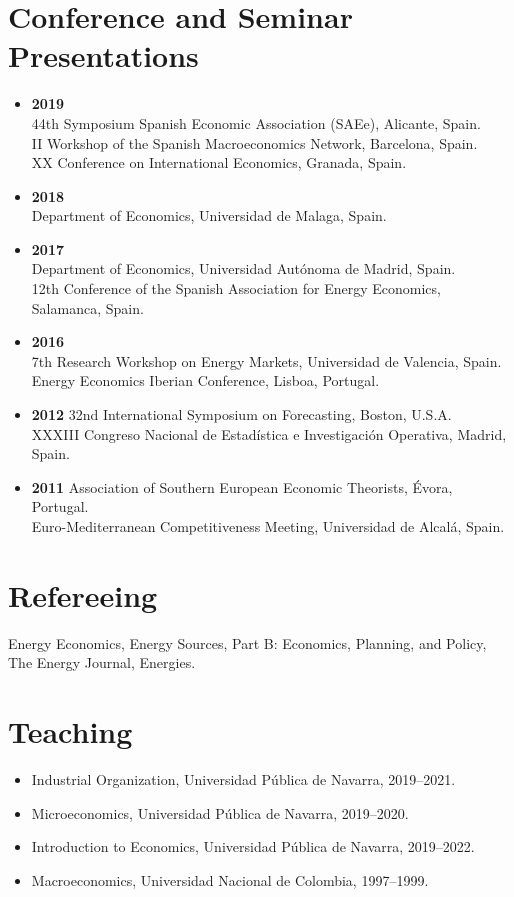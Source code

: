 \documentclass[11pt]{article}\usepackage[]{graphicx}\usepackage[usenames,dvipsnames]{xcolor}
\begin{document}
\section{Conference and Seminar Presentations} 
\begin{itemize}
  \item \textbf{2019}\\
  44th Symposium Spanish Economic Association (SAEe), Alicante, Spain.\\
  II Workshop of the Spanish Macroeconomics Network, Barcelona, Spain.\\
  XX Conference on International Economics, Granada, Spain.
  \item \textbf{2018}\\
  Department of Economics, Universidad de Malaga, Spain.
  \item \textbf{2017}\\
  Department of Economics, Universidad Autónoma de Madrid, Spain.\\
  12th Conference of the Spanish Association for Energy Economics, Salamanca, Spain.
  \item \textbf{2016}\\
  7th Research Workshop on Energy Markets, Universidad de Valencia, Spain.\\
  Energy Economics Iberian Conference, Lisboa, Portugal.
  \item \textbf{2012} 32nd International Symposium on Forecasting, Boston, U.S.A.\\
  XXXIII Congreso Nacional de Estadística e Investigación Operativa, Madrid, Spain.
  \item \textbf{2011} Association of Southern European Economic Theorists, Évora, Portugal.\\
  Euro-Mediterranean Competitiveness Meeting, Universidad de Alcalá, Spain.
\end{itemize}

\section{Refereeing}
\raggedright
Energy Economics, Energy Sources, Part B: Economics, Planning, and Policy, The Energy Journal, Energies.\\

\section{Teaching} 
\begin{itemize}
  \item Industrial Organization, Universidad Pública de Navarra, 2019--2021.
  \item Microeconomics, Universidad Pública de Navarra, 2019--2020.
  \item Introduction to Economics, Universidad Pública de Navarra, 2019--2022.
  \item Macroeconomics, Universidad Nacional de Colombia, 1997--1999.
\end{itemize}
\end{document}

